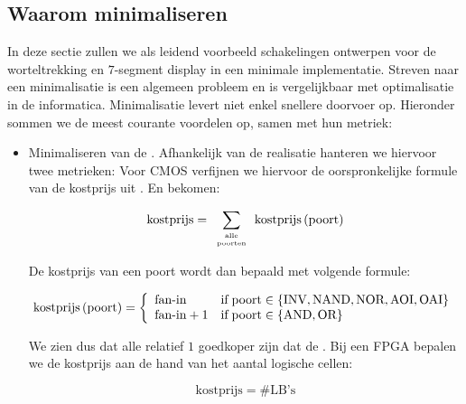 \subsection{Waarom minimaliseren}
In deze sectie zullen we als leidend voorbeeld schakelingen ontwerpen voor de worteltrekking en $7$-segment display in een minimale implementatie. Streven naar een minimalisatie is een algemeen probleem en is vergelijkbaar met optimalisatie in de informatica. Minimalisatie levert niet enkel snellere doorvoer op. Hieronder sommen we de meest courante voordelen op, samen met hun metriek:
\begin{itemize}
\item Minimaliseren van de . Afhankelijk van de realisatie hanteren we hiervoor twee metrieken: Voor CMOS verfijnen we hiervoor de oorspronkelijke formule van de kostprijs uit . En bekomen:

\begin{equation}
\mbox{kostprijs}=\displaystyle\sum_{\tiny\begin{array}{c}\mbox{alle}\\\mbox{poorten}\end{array}}{\funm{kostprijs}{\mbox{poort}}}
\eqnlab{kostenCmos}
\end{equation}

De kostprijs van een poort wordt dan bepaald met volgende formule:

\begin{equation}
\funm{kostprijs}{\mbox{poort}}=\acclguard{
\mbox{fan-in}&\mbox{if}\;\mbox{poort}\in\accl{\mbox{INV},\mbox{NAND},\mbox{NOR},\mbox{AOI},\mbox{OAI}}\\
\mbox{fan-in}+1&\mbox{if}\;\mbox{poort}\in\accl{\mbox{AND},\mbox{OR}}
}
\eqnlab{kostenCmosPoort}
\end{equation}

We zien dus dat alle  relatief $1$ goedkoper zijn dat de . Bij een FPGA bepalen we de kostprijs aan de hand van het aantal logische cellen:

\begin{equation}
\mbox{kostprijs}=\#\mbox{LB's}
\end{equation}


\end{itemize}
